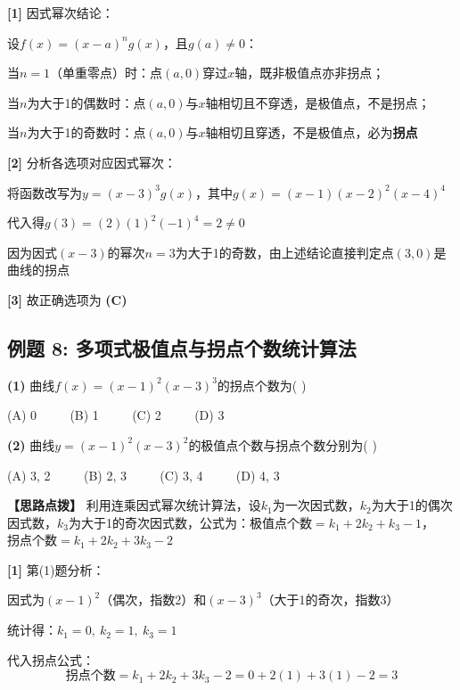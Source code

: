 \documentclass[11pt,a4paper,UTF8]{ctexart}
\begin{document}
\begin{solbox}[分步推导与答题规范]
\textbf{[1]} 因式幂次结论：

设$f(x) = (x - a)^n g(x)$，且$g(a) \neq 0$：

当$n = 1$（单重零点）时：点$(a, 0)$穿过$x$轴，既非极值点亦非拐点；

当$n$为大于1的偶数时：点$(a, 0)$与$x$轴相切且不穿透，是极值点，不是拐点；

当$n$为大于1的奇数时：点$(a, 0)$与$x$轴相切且穿透，不是极值点，必为\textbf{拐点}

\textbf{[2]} 分析各选项对应因式幂次：

将函数改写为$y = (x - 3)^3 g(x)$，其中$g(x) = (x-1)(x-2)^2(x-4)^4$

代入得$g(3) = (2)(1)^2(-1)^4 = 2 \neq 0$

因为因式$(x - 3)$的幂次$n = 3$为大于1的奇数，由上述结论直接判定点$(3, 0)$是曲线的拐点

\textbf{[3]} 故正确选项为 \textbf{(C)}
\end{solbox}


\subsection{例题 8: 多项式极值点与拐点个数统计算法}

\textbf{(1)}  曲线$f(x) = (x-1)^2(x-3)^3$的拐点个数为( )

(A) 0 $\qquad$ (B) 1 $\qquad$ (C) 2 $\qquad$ (D) 3

\textbf{(2)}  曲线$y = (x-1)^2(x-3)^2$的极值点个数与拐点个数分别为( )

(A) 3, 2 $\qquad$ (B) 2, 3 $\qquad$ (C) 3, 4 $\qquad$ (D) 4, 3

\textbf{\color{DeepPurple}【思路点拨】} 利用连乘因式幂次统计算法，设$k_1$为一次因式数，$k_2$为大于1的偶次因式数，$k_3$为大于1的奇次因式数，公式为：$\text{极值点个数} = k_1 + 2k_2 + k_3 - 1$，$\text{拐点个数} = k_1 + 2k_2 + 3k_3 - 2$


\textbf{[1]} 第(1)题分析：

\begin{solbox}[分步推导与答题规范]
因式为$(x-1)^2$（偶次，指数2）和$(x-3)^3$（大于1的奇次，指数3）

统计得：$k_1 = 0,\ k_2 = 1,\ k_3 = 1$

代入拐点公式：
\begin{equation*}
\text{拐点个数} = k_1 + 2k_2 + 3k_3 - 2 = 0 + 2(1) + 3(1) - 2 = 3
\end{equation*}


\end{solbox}
\end{document}
